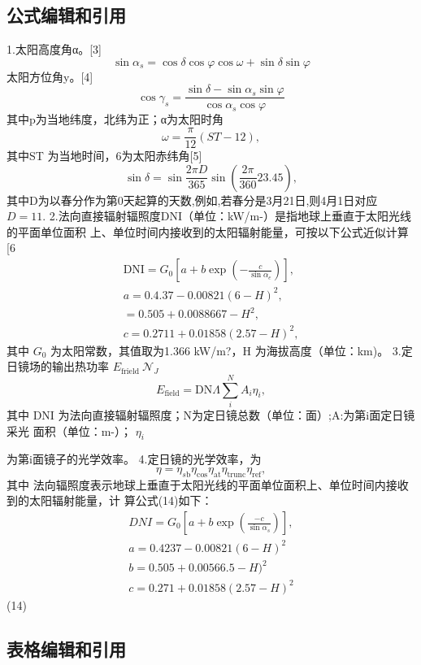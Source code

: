 \documentclass[a4paper,12pt]{article}
\begin{document}
\subsection{公式编辑和引用}
1.太阳高度角α。[3]
$$
\sin\alpha_{s}=\cos\delta\cos\varphi\cos\omega+\sin\delta\sin\varphi
$$
太阳方位角y。[4]
$$
\cos\gamma_{s}={\frac{\sin\delta-\sin\alpha_{s}\sin\varphi}{\cos\alpha_{s}\cos\varphi}}
$$
其中p为当地纬度，北纬为正；α为太阳时角
$$
\omega={\frac{\pi}{12}}(S T-12),
$$
其中ST 为当地时间，6为太阳赤纬角[5]
$$
\sin\delta=\sin\frac{2\pi D}{365}\sin\left(\frac{2\pi}{360}23.45\right),
$$
其中D为以春分作为第0天起算的天数,例如,若春分是3月21日,则4月1日对应
 $D=11.$ 
2.法向直接辐射辐照度DNI（单位：kW/m-）是指地球上垂直于太阳光线的平面单位面积
上、单位时间内接收到的太阳辐射能量，可按以下公式近似计算[6
$$
\begin{array}{l}{\mathrm{DNI}=G_{0}\left[a+b\exp\left(-\frac{c}{\sin\alpha_{e}}\right)\right],}\\ {a=0.4.37-0.00821(6-H)^{2},}\\ {=0.505+0.0088667-H^{2},}\\ {c=0.2711+0.01858(2.57-H)^{2},}\end{array}
$$
其中
 $G_{\mathrm{0}}$ 
为太阳常数，其值取为1.366 kW/m?，H 为海拔高度（单位：km)。
3.定日镜场的输出热功率
 $E_{\mathrm{frield}}\ {\mathcal{N}}_{J}$ 
$$
E_{\mathrm{field}}=\mathrm{DN}\Lambda\sum_{i}^{N}A_{i}\eta_{i},
$$
其中 DNI 为法向直接辐射辐照度；N为定日镜总数（单位：面）;A:为第i面定日镜采光
面积（单位：m-）；
 $\eta_{i}$ 

为第i面镜子的光学效率。
4.定日镜的光学效率，为
$$
\eta=\eta_{s\mathrm{b}}\eta_{\mathrm{cos}}\eta_{\mathrm{at}}\eta_{\mathrm{trunc}}\eta_{\mathrm{ref}},
$$
其中
法向辐照度表示地球上垂直于太阳光线的平面单位面积上、单位时间内接收到的太阳辐射能量，计
算公式(14)如下：
$$
\begin{array}{c}{{D N I=G_{0}\left[a+b\exp\left(\frac{-c}{\sin\alpha_{s}}\right)\right],}}\\ {{a=0.4237-0.00821(6-H)^{2}}}\\ {{b=0.505+0.00566.5-H)^{2}}}\\ {{c=0.271+0.01858(2.57-H)^{2}}}\end{array}
$$
(14)


\subsection{表格编辑和引用}
\end{document}

